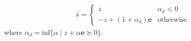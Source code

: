 \begin{equation*}
	\begin{aligned}
		\hat{s} = 
		\left\{
                \begin{array}{ll}
                  z & \alpha_d <0 \\
                  -z+(1+\alpha_d)\textbf{e} & \text{otherwise}
                \end{array}
              \right.
	\end{aligned}
\end{equation*}
where $\alpha_d=\text{inf}\lbrace \alpha\mid z+\alpha\textbf{e}\succeq 0 \rbrace$.































